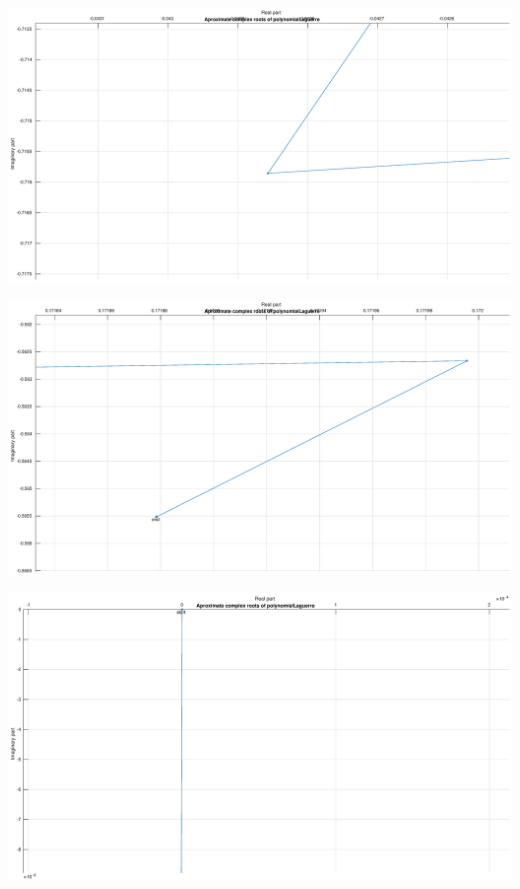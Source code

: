 \documentclass[12pt]{report}
\begin{document}
\begin{center}
   \includegraphics[scale=0.25]{task3complexleft.eps}
\end{center}

\begin{center}
   \includegraphics[scale=0.25]{task3complexright.eps}
\end{center}

\begin{center}
   \includegraphics[scale=0.25]{task3complexup.eps}
\end{center}
\end{document}
